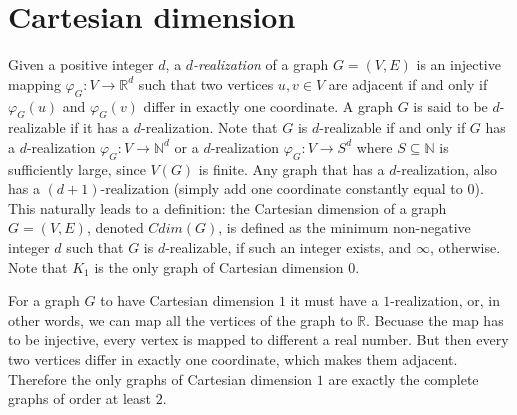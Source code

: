 \documentclass[12pt,a4paper,titlepage,openany]{report}
\begin{document}
\chapter{Cartesian dimension}\label{cdim-chapter}
Given a positive integer $d$, a \emph{$d$-realization} of a graph $G=(V,E)$ is an injective mapping $\varphi_G:V\to \mathbb{R}^d$ such that two vertices $u, v \in V$ are adjacent if and only if $\varphi_G(u)$ and $\varphi_G(v)$ differ in exactly one coordinate. A graph $G$ is said to be $d$-realizable if it has a $d$-realization. Note that $G$ is $d$-realizable if and only if $G$ has a $d$-realization $\varphi_G : V \rightarrow \mathbb{N}^d$ or a $d$-realization $\varphi_G:V\to S^d$ where $S\subseteq \mathbb{N}$ is sufficiently large, since $V(G)$ is finite.\newline
Any graph that has a $d$-realization, also has a $(d+1)$-realization (simply add one coordinate constantly equal to $0$). This naturally leads to a definition: the Cartesian dimension of a graph $G = (V, E)$, denoted $Cdim(G)$, is defined as the minimum non-negative integer $d$ such that $G$ is $d$-realizable, if such an integer exists, and $\infty$, otherwise. Note that $K_1$ is the only graph of Cartesian dimension 0.\newline

For a graph $G$ to have Cartesian dimension $1$ it must have a $1$-realization, or, in other words, we can map all the vertices of the graph to $\mathbb{R}$. Becuase the map has to be injective, every vertex is mapped to different a real number. But then every two vertices differ in exactly one coordinate, which makes them adjacent. Therefore the only graphs of Cartesian dimension $1$ are exactly the complete graphs of order at least $2$.
\end{document}
